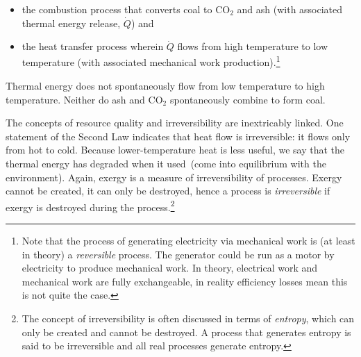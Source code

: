 \begin{itemize}
	\item{the combustion process that converts coal to CO$_{2}$ and ash 
	(with associated thermal energy release, $\dot{Q}$) and}
	\item{the heat transfer process wherein $\dot{Q}$ flows 
	from high temperature to low temperature (with associated mechanical work production).\footnote{Note that the process of generating
	electricity via mechanical work is (at least in theory) a
	\emph{reversible} process.
	The generator could be run as a motor by electricity to produce
	mechanical work.
	In theory,
	electrical work and mechanical work are fully exchangeable,
	in reality efficiency losses mean this is not quite the case.}}
\end{itemize}

\noindent{}Thermal energy does not spontaneously flow from low temperature to high temperature.
Neither do ash and CO$_{2}$ spontaneously combine to form coal.

The concepts of resource quality and irreversibility are inextricably linked.
One statement of the Second Law indicates that heat flow is irreversible: 
it flows only from hot to cold. 
Because lower-temperature heat is less useful, 
we say that the thermal energy has 
degraded when it used~(come 
into equilibrium with the environment).
Again,
exergy is a measure of irreversibility of processes.
Exergy cannot be created, it can only be destroyed,
hence a process is \emph{irreversible}
if exergy is destroyed during the process.\footnote{The concept of
irreversibility is often discussed in terms of \emph{entropy},
which can only be created and cannot be destroyed.
A process that generates entropy is said to be irreversible
and all real processes generate entropy.}


